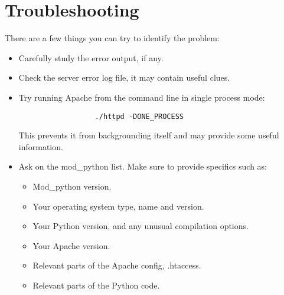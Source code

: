 \section{Troubleshooting\label{inst-trouble}}

There are a few things you can try to identify the problem: 

\begin{itemize}

\item Carefully study the error output, if any. 

\item Check the server error log file, it may contain useful clues. 

\item Try running Apache from the command line in single process mode:
\begin{verbatim}
                  ./httpd -DONE_PROCESS
\end{verbatim}
This prevents it from backgrounding itself and may provide some useful
information.

\item
Ask on the mod_python list. Make sure to provide specifics such as:

\begin{itemize}

\item Mod_python version.
\item Your operating system type, name and version.
\item Your Python version, and any unusual compilation options.
\item Your Apache version.
\item Relevant parts of the Apache config, .htaccess.
\item Relevant parts of the Python code.

\end{itemize}

\end{itemize}
